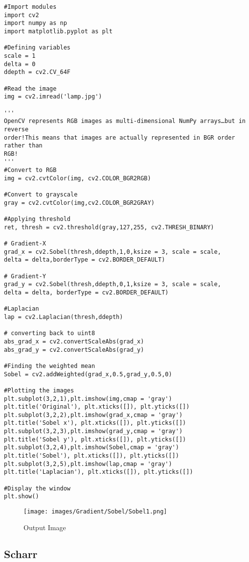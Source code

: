 \documentclass[]{article}
\begin{document}
\begin{verbatim}
#Import modules
import cv2
import numpy as np
import matplotlib.pyplot as plt

#Defining variables
scale = 1
delta = 0
ddepth = cv2.CV_64F

#Read the image
img = cv2.imread('lamp.jpg')

'''
OpenCV represents RGB images as multi-dimensional NumPy arrays…but in reverse
order!This means that images are actually represented in BGR order rather than
RGB!
'''
#Convert to RGB
img = cv2.cvtColor(img, cv2.COLOR_BGR2RGB)    

#Convert to grayscale
gray = cv2.cvtColor(img,cv2.COLOR_BGR2GRAY) 

#Applying threshold
ret, thresh = cv2.threshold(gray,127,255, cv2.THRESH_BINARY) 

# Gradient-X
grad_x = cv2.Sobel(thresh,ddepth,1,0,ksize = 3, scale = scale, 
delta = delta,borderType = cv2.BORDER_DEFAULT)

# Gradient-Y
grad_y = cv2.Sobel(thresh,ddepth,0,1,ksize = 3, scale = scale, 
delta = delta, borderType = cv2.BORDER_DEFAULT)

#Laplacian
lap = cv2.Laplacian(thresh,ddepth) 

# converting back to uint8
abs_grad_x = cv2.convertScaleAbs(grad_x)   
abs_grad_y = cv2.convertScaleAbs(grad_y)

#Finding the weighted mean
Sobel = cv2.addWeighted(grad_x,0.5,grad_y,0.5,0)

#Plotting the images
plt.subplot(3,2,1),plt.imshow(img,cmap = 'gray')
plt.title('Original'), plt.xticks([]), plt.yticks([])
plt.subplot(3,2,2),plt.imshow(grad_x,cmap = 'gray')
plt.title('Sobel x'), plt.xticks([]), plt.yticks([])
plt.subplot(3,2,3),plt.imshow(grad_y,cmap = 'gray')
plt.title('Sobel y'), plt.xticks([]), plt.yticks([])
plt.subplot(3,2,4),plt.imshow(Sobel,cmap = 'gray')
plt.title('Sobel'), plt.xticks([]), plt.yticks([])
plt.subplot(3,2,5),plt.imshow(lap,cmap = 'gray')
plt.title('Laplacian'), plt.xticks([]), plt.yticks([])

#Display the window
plt.show()
\end{verbatim}

\begin{figure}[htbp]
\centering
\texttt{[image: images/Gradient/Sobel/Sobel1.png]}
\caption{Output Image}
\end{figure}

\subsection{Scharr}\label{scharr-1}
\end{document}
